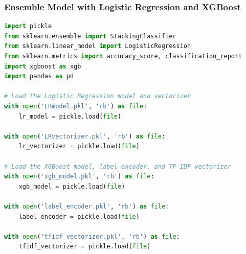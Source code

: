 \subsubsection{Ensemble Model with Logistic Regression and XGBoost}

\begin{tcolorbox}[colback=gray!5!white, colframe=gray!80!black, boxrule=0.5pt, title=Model Loading and Preprocessing]
    \begin{lstlisting}[language=Python]
import pickle
from sklearn.ensemble import StackingClassifier
from sklearn.linear_model import LogisticRegression
from sklearn.metrics import accuracy_score, classification_report
import xgboost as xgb
import pandas as pd

# Load the Logistic Regression model and vectorizer
with open('LRmodel.pkl', 'rb') as file:
    lr_model = pickle.load(file)

with open('LRvectorizer.pkl', 'rb') as file:
    lr_vectorizer = pickle.load(file)

# Load the XGBoost model, label encoder, and TF-IDF vectorizer
with open('xgb_model.pkl', 'rb') as file:
    xgb_model = pickle.load(file)

with open('label_encoder.pkl', 'rb') as file:
    label_encoder = pickle.load(file)

with open('tfidf_vectorizer.pkl', 'rb') as file:
    tfidf_vectorizer = pickle.load(file)
    \end{lstlisting}
\end{tcolorbox}

